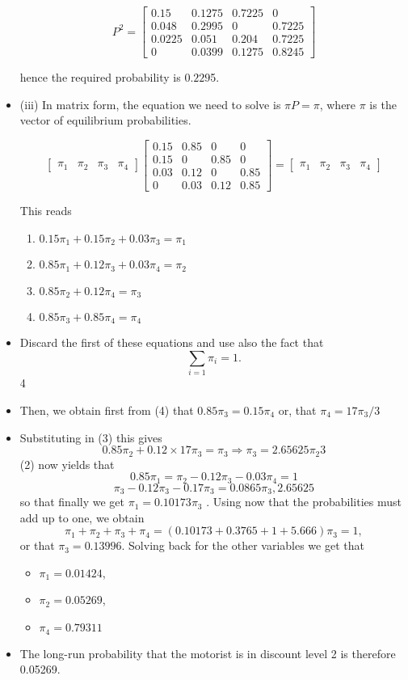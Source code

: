 \documentclass[a4paper,12pt]{article}
\begin{document}
\begin{itemize}
\[ P^2 =\begin{bmatrix}
0.15 & 0.1275 & 0.7225 & 0 \\
0.048 & 0.2995 & 0 & 0.7225 \\
0.0225 & 0.051 & 0.204 & 0.7225 \\
0 & 0.0399 & 0.1275 & 0.8245 
\end{bmatrix}  \]


hence the required probability is $0.229$5.
\item (iii)
In matrix form, the equation we need to solve is $\pi P = \pi$,
where $\pi$ is the vector of equilibrium probabilities.

\[ \begin{bmatrix}
\pi_1& \pi_2 & \pi_3 & \pi_4 
\end{bmatrix}\begin{bmatrix}
0.15 & 0.85 & 0 & 0 \\
0.15 & 0 & 0.85 & 0 \\
0.03 & 0.12 & 0 & 0.85 \\
0 & 0.03 & 0.12 & 0.85 
\end{bmatrix} = \begin{bmatrix}
\pi_1& \pi_2 & \pi_3 & \pi_4 
\end{bmatrix}  \]

This reads
\begin{enumerate}[(1)]
\item ${ \displaystyle 0.15 \pi_1 + 0.15 \pi_2 + 0.03 \pi_3 = \pi_1 }$
\item ${ \displaystyle 0.85 \pi_1 + 0.12 \pi_3 + 0.03 \pi_4 = \pi_2 }$
\item ${ \displaystyle 0.85 \pi_2 + 0.12 \pi_4 = \pi_3 }$
\item ${ \displaystyle  0.85 \pi_3 + 0.85 \pi_4 = \pi_4 }$
\end{enumerate}
\item Discard the first of these equations and use also the fact that
\[\sum_{i= 1} \pi_i = 1 .\]
4

\item Then, we obtain first from (4) that $0.85 \pi_3 = 0.15 \pi_4$
or, that $\pi_4 = 17 \pi_3 / 3$

\item Substituting in (3) this gives
\[0.85 \pi_2 + 0.12 ×
17
\pi_3 = \pi_3 ⇒ \pi_3 = 2.65625 \pi_2
3\]
(2) now yields that
\[0.85 \pi_1 = \pi_2 − 0.12 \pi_3 − 0.03 \pi_4 =
1\]
\[\pi_3 − 0.12 \pi_3 − 0.17 \pi_3 = 0.0865 \pi_3 ,
2.65625\]
so that finally we get $\pi_1 = 0.10173 \pi_3$ .
Using now that the probabilities must add up to one, we obtain
\[ \pi_1 + \pi_2 + \pi_3 + \pi_4 = (0.10173 + 0.3765 + 1 + 5.666) \pi_3 = 1, \]
or that $\pi_3 = 0.13996$.
Solving back for the other variables we get that
\begin{itemize}
    \item $ { \displaystyle \pi_1 = 0.01424}$, 
    \item $ { \displaystyle \pi_2 = 0.05269}$, 
    \item $ { \displaystyle \pi_4 = 0.79311}$
\end{itemize}

\item The long-run probability that the motorist is in discount level 2 is therefore
0.05269.

\end{itemize}
\end{document}
